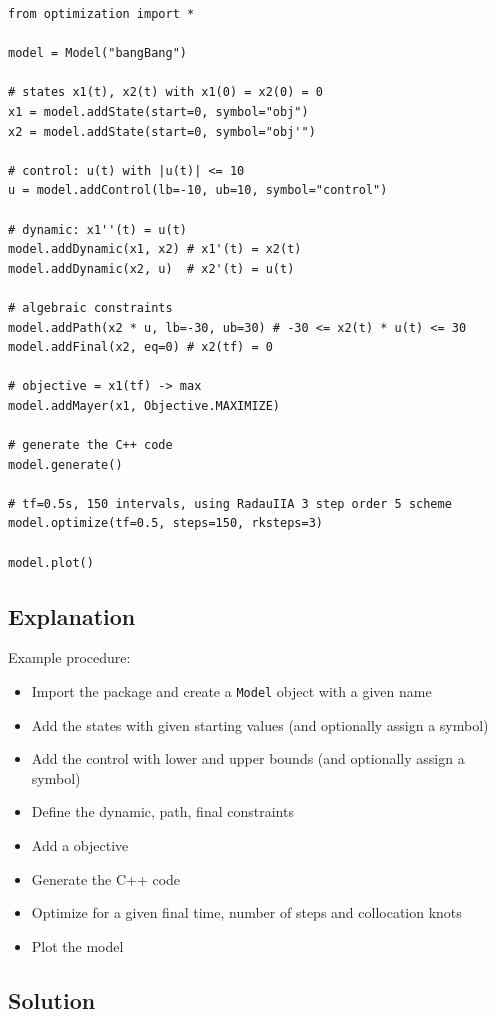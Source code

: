 \documentclass[12pt]{article}
\begin{document}
	\begin{lstlisting}
from optimization import *

model = Model("bangBang")

# states x1(t), x2(t) with x1(0) = x2(0) = 0
x1 = model.addState(start=0, symbol="obj") 
x2 = model.addState(start=0, symbol="obj'")

# control: u(t) with |u(t)| <= 10
u = model.addControl(lb=-10, ub=10, symbol="control") 

# dynamic: x1''(t) = u(t)
model.addDynamic(x1, x2) # x1'(t) = x2(t)
model.addDynamic(x2, u)  # x2'(t) = u(t)

# algebraic constraints
model.addPath(x2 * u, lb=-30, ub=30) # -30 <= x2(t) * u(t) <= 30
model.addFinal(x2, eq=0) # x2(tf) = 0

# objective = x1(tf) -> max
model.addMayer(x1, Objective.MAXIMIZE) 

# generate the C++ code
model.generate() 

# tf=0.5s, 150 intervals, using RadauIIA 3 step order 5 scheme
model.optimize(tf=0.5, steps=150, rksteps=3)

model.plot()
	\end{lstlisting}

	\subsection{Explanation}
	Example procedure:
	\begin{itemize}
		\item Import the package and create a \texttt{Model} object with a given name
		\item Add the states with given starting values (and optionally assign a symbol)
		\item Add the control with lower and upper bounds (and optionally assign a symbol)
		\item Define the dynamic, path, final constraints
		\item Add a objective
		\item Generate the C++ code
		\item Optimize for a given final time, number of steps and collocation knots
		\item Plot the model
	\end{itemize}

	\subsection{Solution}
	
\end{document}
